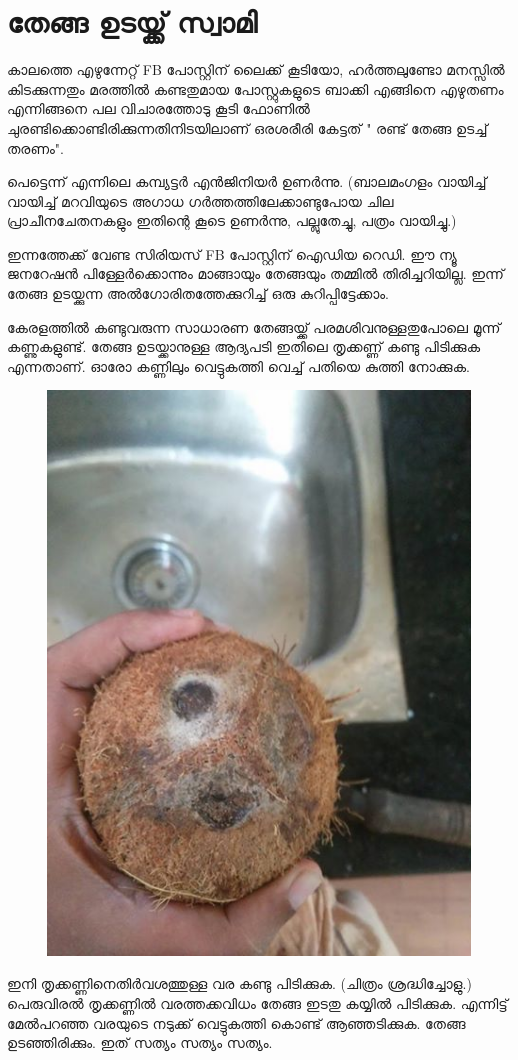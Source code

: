 \documentclass[10pt,a4paper]{report}
\begin{document}
\section{ തേങ്ങ ഉടയ്ക്ക് സ്വാമി}

കാലത്തെ എഴുന്നേറ്റ്  FB പോസ്റ്റിന് ലൈക്ക് കൂടിയോ, ഹർത്തലുണ്ടോ മനസ്സിൽ കിടക്കുന്നതും മരത്തിൽ കണ്ടതുമായ  പോസ്റ്റുകളുടെ ബാക്കി എങ്ങിനെ എഴുതണം എന്നിങ്ങനെ പല വിചാരത്തോടു കൂടി ഫോണിൽ ചുരണ്ടിക്കൊണ്ടിരിക്കുന്നതിനിടയിലാണ് ഒരശരീരി കേട്ടത് " രണ്ട് തേങ്ങ ഉടച്ച് തരണം".

പെട്ടെന്ന് എന്നിലെ കമ്പ്യട്ടർ എൻജിനിയർ ഉണർന്നു. (ബാലമംഗളം വായിച്ച് വായിച്ച് മറവിയുടെ അഗാധ ഗർത്തത്തിലേക്കാണ്ടുപോയ ചില പ്രാചീനചേതനകളും ഇതിന്റെ കൂടെ ഉണർന്നു, പല്ലുതേച്ചു, പത്രം വായിച്ചു.)

ഇന്നത്തേക്ക് വേണ്ട സിരിയസ് FB പോസ്റ്റിന് ഐഡിയ റെഡി. ഈ ന്യൂ ജനറേഷൻ പിള്ളേർക്കൊന്നും മാങ്ങായും തേങ്ങയും തമ്മിൽ തിരിച്ചറിയില്ല. ഇന്ന് തേങ്ങ ഉടയ്ക്കുന്ന അൽഗോരിതത്തേക്കുറിച്ച് ഒരു കുറിപ്പിട്ടേക്കാം.

കേരളത്തിൽ കണ്ടുവരുന്ന സാധാരണ തേങ്ങയ്ക്ക് പരമശിവനുള്ളതുപോലെ മൂന്ന് കണ്ണുകളുണ്ട്. തേങ്ങ ഉടയ്ക്കാനുള്ള ആദ്യപടി ഇതിലെ തൃക്കണ്ണ് കണ്ടു പിടിക്കുക എന്നതാണ്. ഓരോ കണ്ണിലും വെട്ടുകത്തി വെച്ച് പതിയെ കുത്തി നോക്കുക.  
      \begin{figure}[H]
  \center
\includegraphics[scale=.25]{images/t1} 
\label{t1}
\caption{  }
\end{figure}
ഇനി തൃക്കണ്ണിനെതിർവശത്തുള്ള വര കണ്ടു പിടിക്കുക. (ചിത്രം ശ്രദ്ധിച്ചോളു.) പെരുവിരൽ തൃക്കണ്ണിൽ വരത്തക്കവിധം തേങ്ങ ഇടതു കയ്യിൽ പിടിക്കുക. എന്നിട്ട് മേൽപറഞ്ഞ വരയുടെ നടുക്ക് വെട്ടുകത്തി കൊണ്ട് ആഞ്ഞടിക്കുക. തേങ്ങ ഉടഞ്ഞിരിക്കും. ഇത് സത്യം സത്യം സത്യം.
\end{document}
